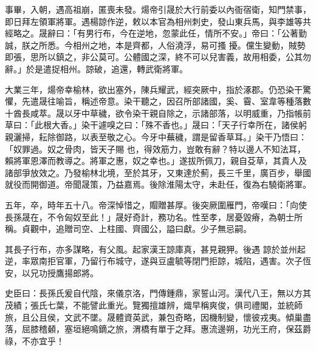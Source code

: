 \begin{pinyinscope}
 事畢，入朝，遇高祖崩，匿喪未發。煬帝引晟於大行前委以內衙宿衛，知門禁事，即日拜左領軍將軍。遇楊諒作逆，敕以本官為相州刺史，發山東兵馬，與李雄等共經略之。晟辭曰：「有男行布，今在逆地，忽蒙此任，情所不安。」帝曰：「公著勤誠，朕之所悉。今相州之地，本是齊都，人俗澆浮，易可搔
 擾。儻生變動，賊勢即張，思所以鎮之，非公莫可。公體國之深，終不可以兒害義，故用相委，公其勿辭。」於是遣捉相州。諒破，追還，轉武衛將軍。



 大業三年，煬帝幸榆林，欲出塞外，陳兵耀武，經突厥中，指於涿郡。仍恐染干驚懼，先遣晟往喻旨，稱述帝意。染干聽之，因召所部諸國，奚、霫、室韋等種落數十酋長咸萃。晟以牙中草穢，欲令染干親自除之，示諸部落，以明威重，乃指帳前草曰：「此根大香。」染干遽嗅之曰：「殊不香也。」晟曰：「天子行幸所在，諸侯躬親灑掃，耘除御路，以表至敬之心。今牙中蕪穢，謂是留香草耳。」染干乃悟曰：「奴罪過。奴之骨肉，皆天子賜
 也，得效筋力，豈敢有辭？特以邊人不知法耳，賴將軍恩澤而教導之。將軍之惠，奴之幸也。」遂拔所佩刀，親自芟草，其貴人及諸部爭放效之。乃發榆林北境，至於其牙，又東達於薊，長三千里，廣百步，舉國就役而開御道。帝聞晟策，乃益嘉焉。後除淮陽太守，未赴任，復為右驍衛將軍。



 五年，卒，時年五十八。帝深悼惜之，賵贈甚厚。後突厥圍雁門，帝嘆曰：「向使長孫晟在，不令匈奴至此！」晟好奇計，務功名。性至孝，居憂毀瘠，為朝士所稱。貞觀中，追贈司空、上柱國、齊國公，謚曰獻。少子無忌嗣。



 其長子行布，亦多謀略，有父風。起家漢王諒庫真，甚見親狎。後遇
 諒於並州起逆，率眾南拒官軍，乃留行布城守，遂與豆盧毓等閉門拒諒，城陷，遇害。次子恆安，以兄功授鷹揚郎將。



 史臣曰：長孫氏爰自代陰，來儀京洛，門傳鍾鼎，家誓山河。漢代八王，無以方其茂績；張氏七葉，不能譬此重光。覽獨擅雄辨，熾早稱爽俊，俱司禮閣，並統師旅，且公且侯，文武不墜。晟體資英武，兼包奇略，因機制變，懷彼戎夷。傾巢盡落，屈膝稽顙，塞垣絕鳴鏑之旅，渭橋有單于之拜。惠流邊朔，功光王府，保茲爵祿，不亦宜乎！



\end{pinyinscope}